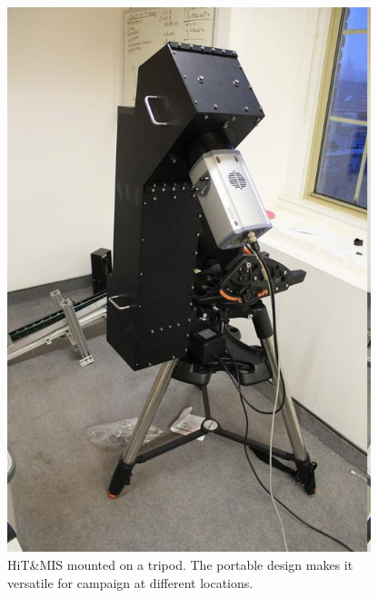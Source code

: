 \documentclass[crop=false,class=mitthesis,oneside,font=12pt]{standalone}
\begin{document}
\begin{figure}[H]
	\centering\includegraphics[width=25pc]{Hitmis_tripod_mount.JPG}
	\caption{HiT\&MIS mounted on a tripod. The portable design makes it versatile for campaign at different locations.}
	\label{fig:hitmis_tripod}
\end{figure}
\end{document}
